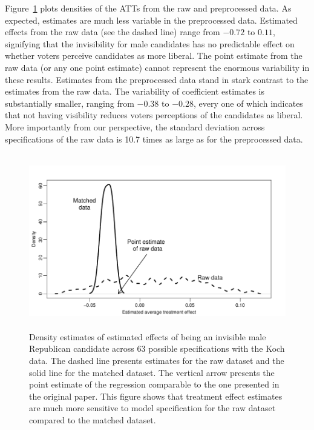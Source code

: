 \documentclass[11pt,titlepage]{article}
\begin{document}
Figure~\ref{fg:kochdens} plots densities of the ATTs from the raw and
preprocessed data.  As expected, estimates are much less variable in
the preprocessed data.  Estimated effects from the raw data (see the
dashed line) range from $-0.72$ to $0.11$, signifying that the
invisibility for male candidates has no predictable effect on whether
voters perceive candidates as more liberal.  The point estimate from
the raw data (or any one point estimate) cannot represent the enormous
variability in these results.  Estimates from the preprocessed data
stand in stark contrast to the estimates from the raw data.  The
variability of coefficient estimates is substantially smaller, ranging
from $-0.38$ to $-0.28$, every one of which indicates that not having
visibility reduces voters perceptions of the candidates as liberal.
More importantly from our perspective, the standard deviation across
specifications of the raw data is 10.7 times as large as for the
preprocessed data.
\begin{figure}[t] 
 \begin{center}
   \includegraphics[height=3in,angle=0]{figs/kochdens.pdf}
 \end{center} 
 \vspace{-0.275in}
 \caption{Density estimates of estimated effects of
   being an invisible male Republican candidate across 63
   possible specifications with the Koch data.  The dashed line
   presents estimates for the raw dataset and the solid line for the
   matched dataset.  The vertical arrow presents the point estimate of
   the regression comparable to the one presented in the original
   paper.  This figure shows that treatment effect estimates are much
   more sensitive to model specification for the raw dataset compared
   to the matched dataset.}
 \label{fg:kochdens}
\end{figure}
\end{document}
